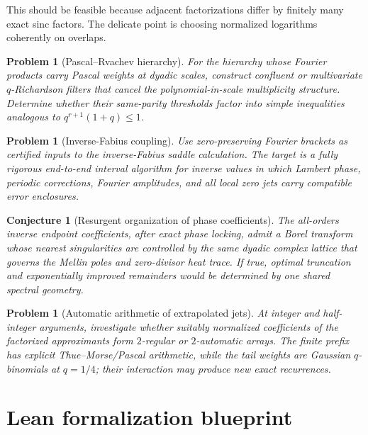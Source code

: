 \documentclass[11pt,oneside]{article}
\numberwithin{equation}{section}
\theoremstyle{frontier}
\newtheorem{conjecture}[theorem]{Conjecture}
\newtheorem{problem}[theorem]{Problem}
\theoremstyle{definition}
\theoremstyle{remark}
\begin{document}
This should be feasible because adjacent factorizations differ by finitely many exact sinc
factors.  The delicate point is choosing normalized logarithms coherently on overlaps.

\begin{problem}[Pascal--Rvachev hierarchy]\label{prob:pascal}
For the hierarchy whose Fourier products carry Pascal weights at dyadic scales, construct
confluent or multivariate $q$-Richardson filters that cancel the polynomial-in-scale
multiplicity structure.  Determine whether their same-parity thresholds factor into simple
inequalities analogous to $q^{r+1}(1+q)\le1$.
\end{problem}

\begin{problem}[Inverse-Fabius coupling]\label{prob:inverse-coupling}
Use zero-preserving Fourier brackets as certified inputs to the inverse-Fabius saddle
calculation.  The target is a fully rigorous end-to-end interval algorithm for inverse
values in which Lambert phase, periodic corrections, Fourier amplitudes, and all local zero
jets carry compatible error enclosures.
\end{problem}

\begin{conjecture}[Resurgent organization of phase coefficients]\label{conj:resurgence}
The all-orders inverse endpoint coefficients, after exact phase locking, admit a Borel
transform whose nearest singularities are controlled by the same dyadic complex lattice
that governs the Mellin poles and zero-divisor heat trace.  If true, optimal truncation and
exponentially improved remainders would be determined by one shared spectral geometry.
\end{conjecture}

\begin{problem}[Automatic arithmetic of extrapolated jets]\label{prob:automatic-jets}
At integer and half-integer arguments, investigate whether suitably normalized coefficients
of the factorized approximants form $2$-regular or $2$-automatic arrays.  The finite prefix
has explicit Thue--Morse/Pascal arithmetic, while the tail weights are Gaussian
$q$-binomials at $q=1/4$; their interaction may produce new exact recurrences.
\end{problem}

\section{Lean formalization blueprint}\label{sec:lean}
\end{document}
